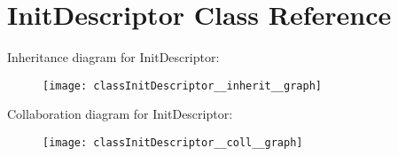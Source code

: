 \hypertarget{classInitDescriptor}{}\section{Init\+Descriptor Class Reference}
\label{classInitDescriptor}


Inheritance diagram for Init\+Descriptor\+:\nopagebreak
\begin{figure}[H]
\begin{center}
\leavevmode
\texttt{[image: classInitDescriptor\_\_inherit\_\_graph]}
\end{center}
\end{figure}


Collaboration diagram for Init\+Descriptor\+:\nopagebreak
\begin{figure}[H]
\begin{center}
\leavevmode
\texttt{[image: classInitDescriptor\_\_coll\_\_graph]}
\end{center}
\end{figure}

